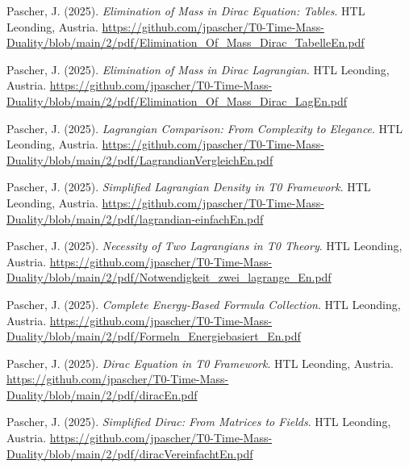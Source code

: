 \documentclass{article}
\begin{document}
\begin{thebibliography}{99}
		Pascher, J. (2025).
		\textit{Elimination of Mass in Dirac Equation: Tables}.
		HTL Leonding, Austria.
		\url{https://github.com/jpascher/T0-Time-Mass-Duality/blob/main/2/pdf/Elimination_Of_Mass_Dirac_TabelleEn.pdf}
		
		Pascher, J. (2025).
		\textit{Elimination of Mass in Dirac Lagrangian}.
		HTL Leonding, Austria.
		\url{https://github.com/jpascher/T0-Time-Mass-Duality/blob/main/2/pdf/Elimination_Of_Mass_Dirac_LagEn.pdf}
		
		
		Pascher, J. (2025).
		\textit{Lagrangian Comparison: From Complexity to Elegance}.
		HTL Leonding, Austria.
		\url{https://github.com/jpascher/T0-Time-Mass-Duality/blob/main/2/pdf/LagrandianVergleichEn.pdf}
		
		Pascher, J. (2025).
		\textit{Simplified Lagrangian Density in T0 Framework}.
		HTL Leonding, Austria.
		\url{https://github.com/jpascher/T0-Time-Mass-Duality/blob/main/2/pdf/lagrandian-einfachEn.pdf}
		
		Pascher, J. (2025).
		\textit{Necessity of Two Lagrangians in T0 Theory}.
		HTL Leonding, Austria.
		\url{https://github.com/jpascher/T0-Time-Mass-Duality/blob/main/2/pdf/Notwendigkeit_zwei_lagrange_En.pdf}
		
		Pascher, J. (2025).
		\textit{Complete Energy-Based Formula Collection}.
		HTL Leonding, Austria.
		\url{https://github.com/jpascher/T0-Time-Mass-Duality/blob/main/2/pdf/Formeln_Energiebasiert_En.pdf}
		
		
		Pascher, J. (2025).
		\textit{Dirac Equation in T0 Framework}.
		HTL Leonding, Austria.
		\url{https://github.com/jpascher/T0-Time-Mass-Duality/blob/main/2/pdf/diracEn.pdf}
		
		Pascher, J. (2025).
		\textit{Simplified Dirac: From Matrices to Fields}.
		HTL Leonding, Austria.
		\url{https://github.com/jpascher/T0-Time-Mass-Duality/blob/main/2/pdf/diracVereinfachtEn.pdf}
		
		

\end{thebibliography}
\end{document}
